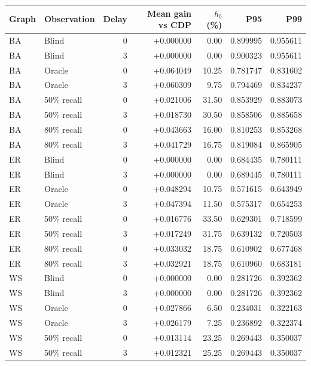 \begin{fixedtable}\centering
\small
\caption{All topology, observation and delay groups of the guarded local policy.}\label{tab:reliability_groups}
\begin{tabularx}{\linewidth}{llrrrrr}\toprule
Graph & Observation & Delay & Mean gain vs CDP & $h_b$ (\%) & P95 & P99\\\midrule
BA & Blind & 0 & +0.000000 & 0.00 & 0.899995 & 0.955611\\
BA & Blind & 3 & +0.000000 & 0.00 & 0.900323 & 0.955611\\
BA & Oracle & 0 & +0.064049 & 10.25 & 0.781747 & 0.831602\\
BA & Oracle & 3 & +0.060309 & 9.75 & 0.794469 & 0.834237\\
BA & 50\% recall & 0 & +0.021006 & 31.50 & 0.853929 & 0.883073\\
BA & 50\% recall & 3 & +0.018730 & 30.50 & 0.858506 & 0.885658\\
BA & 80\% recall & 0 & +0.043663 & 16.00 & 0.810253 & 0.853268\\
BA & 80\% recall & 3 & +0.041729 & 16.75 & 0.819084 & 0.865905\\
ER & Blind & 0 & +0.000000 & 0.00 & 0.684435 & 0.780111\\
ER & Blind & 3 & +0.000000 & 0.00 & 0.689445 & 0.780111\\
ER & Oracle & 0 & +0.048294 & 10.75 & 0.571615 & 0.643949\\
ER & Oracle & 3 & +0.047394 & 11.50 & 0.575317 & 0.654253\\
ER & 50\% recall & 0 & +0.016776 & 33.50 & 0.629301 & 0.718599\\
ER & 50\% recall & 3 & +0.017249 & 31.75 & 0.639132 & 0.720503\\
ER & 80\% recall & 0 & +0.033032 & 18.75 & 0.610902 & 0.677468\\
ER & 80\% recall & 3 & +0.032921 & 18.75 & 0.610960 & 0.683181\\
WS & Blind & 0 & +0.000000 & 0.00 & 0.281726 & 0.392362\\
WS & Blind & 3 & +0.000000 & 0.00 & 0.281726 & 0.392362\\
WS & Oracle & 0 & +0.027866 & 6.50 & 0.234031 & 0.322163\\
WS & Oracle & 3 & +0.026179 & 7.25 & 0.236892 & 0.322374\\
WS & 50\% recall & 0 & +0.013114 & 23.25 & 0.269443 & 0.350037\\
WS & 50\% recall & 3 & +0.012321 & 25.25 & 0.269443 & 0.350037\\

\end{tabularx}
\end{fixedtable}

